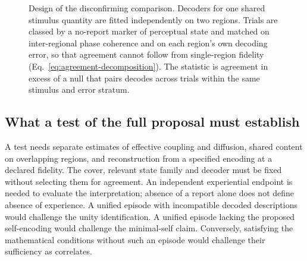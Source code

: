 \documentclass[12pt]{article}
\providecommand{\nolinenumbers}{}
\begin{document}
\begin{figure}[htbp]
\centering
{}
\caption{Design of the disconfirming comparison. Decoders for one shared stimulus quantity are fitted independently on two regions. Trials are classed by a no-report marker of perceptual state and matched on inter-regional phase coherence and on each region's own decoding error, so that agreement cannot follow from single-region fidelity (Eq.~\eqref{eq:agreement-decomposition}). The statistic is agreement in excess of a null that pairs decodes across trials within the same stimulus and error stratum.}
\label{fig:test}
\end{figure}

\subsection{What a test of the full proposal must establish}

A test needs separate estimates of effective coupling and diffusion, shared
content on overlapping regions, and reconstruction from a specified encoding
at a declared fidelity. The cover, relevant state family and decoder must be
fixed without selecting them for agreement. An independent experiential
endpoint is needed to evaluate the interpretation; absence of a report alone
does not define absence of experience. A unified episode with incompatible
decoded descriptions would challenge the unity identification. A unified
episode lacking the proposed self-encoding would challenge the minimal-self
claim. Conversely, satisfying the mathematical conditions without such an
episode would challenge their sufficiency as correlates.
\end{document}
